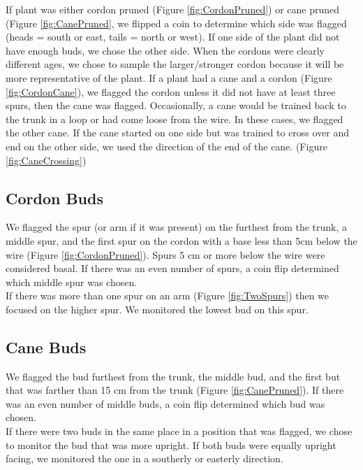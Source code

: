 \documentclass[11pt,letter]{article}
\begin{document}
If plant was either cordon pruned (Figure \ref{fig:CordonPruned}) or cane pruned (Figure \ref{fig:CanePruned}, we flipped a coin to determine which side was flagged (heads = south or east, tails = north or west). If one side of the plant did not have enough buds, we chose the other side. When the cordons were clearly different ages, we chose to sample the larger/stronger cordon because it will be more representative of the plant. If a plant had a cane and a cordon (Figure \ref{fig:CordonCane}), we flagged the cordon unless it did not have at least three spurs, then the cane was flagged. Occasionally, a cane would be trained back to the trunk in a loop or had come loose from the wire. In these cases, we flagged the other cane. If the cane started on one side but was trained to cross over and end on the other side, we used the direction of the end of the cane. (Figure \ref{fig:CaneCrossing})


\subsection{Cordon Buds}

We flagged the spur (or arm if it was present) on the furthest from the trunk, a middle spur, and the first spur on the cordon with a base less than 5cm below the wire (Figure \ref{fig:CordonPruned}). Spurs 5 cm or more below the wire were considered basal. If there was an even number of spurs, a coin flip determined which middle spur was chosen. \\

If there was more than one spur on an arm (Figure \ref{fig:TwoSpurs}) then we focused on the higher spur. We monitored the lowest bud on this spur. 

\subsection{Cane Buds}

We flagged the bud furthest from the trunk, the middle bud, and the first but that was farther than 15 cm from the trunk (Figure \ref{fig:CanePruned}). If there was an even number of middle buds, a coin flip determined which bud was chosen. \\

If there were two buds in the same place in a position that was flagged, we chose to monitor the bud that was more upright. If both buds were equally upright facing, we monitored the one in a southerly or easterly direction. 
\end{document}
